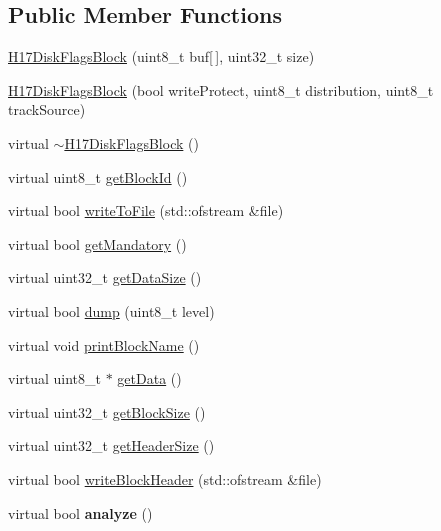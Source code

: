 \subsection*{Public Member Functions}
\begin{DoxyCompactItemize}
\item 
\hyperlink{classH17DiskFlagsBlock_a335188fe3afe1ac2dea9bd64da8bd498}{H17\+Disk\+Flags\+Block} (uint8\+\_\+t buf\mbox{[}$\,$\mbox{]}, uint32\+\_\+t size)
\item 
\hyperlink{classH17DiskFlagsBlock_ab22af88da1209fa46912ae9d59566299}{H17\+Disk\+Flags\+Block} (bool write\+Protect, uint8\+\_\+t distribution, uint8\+\_\+t track\+Source)
\item 
virtual \hyperlink{classH17DiskFlagsBlock_ac2cfc45fd4f7f697b0d55d6dff555c9c}{$\sim$\+H17\+Disk\+Flags\+Block} ()
\item 
virtual uint8\+\_\+t \hyperlink{classH17DiskFlagsBlock_a6dd7cfd338fdcdfb7b50f0b2cf1c8ed6}{get\+Block\+Id} ()
\item 
virtual bool \hyperlink{classH17DiskFlagsBlock_a50319616d0931d82ddfb58c00f5909c6}{write\+To\+File} (std\+::ofstream \&file)
\item 
virtual bool \hyperlink{classH17DiskFlagsBlock_a5b6fc1d4788fdb8cd88cbc00aa9bf32b}{get\+Mandatory} ()
\item 
virtual uint32\+\_\+t \hyperlink{classH17DiskFlagsBlock_addf34cf69e125df697a0281fe5fd6a1d}{get\+Data\+Size} ()
\item 
virtual bool \hyperlink{classH17DiskFlagsBlock_ab843a71d840fd2fc3623571ae6c9e56f}{dump} (uint8\+\_\+t level)
\item 
virtual void \hyperlink{classH17DiskFlagsBlock_abd8ef7b357afb9442537ea6cc335bd80}{print\+Block\+Name} ()
\item 
virtual uint8\+\_\+t $\ast$ \hyperlink{classH17Block_a6c2432cccdacdfb1a335bd924f19d942}{get\+Data} ()
\item 
virtual uint32\+\_\+t \hyperlink{classH17Block_a0327b6359cdf502269bbb7c6f35fae18}{get\+Block\+Size} ()
\item 
virtual uint32\+\_\+t \hyperlink{classH17Block_ad71ae203afc8713d4ee7416757fadbbe}{get\+Header\+Size} ()
\item 
virtual bool \hyperlink{classH17Block_a5c4d56a6c991c87fb9215797ce63b804}{write\+Block\+Header} (std\+::ofstream \&file)
\item 
\hypertarget{classH17Block_ae53600d945ed3ffac13d3a769a1e1ab2}{}virtual bool {\bfseries analyze} ()\label{classH17Block_ae53600d945ed3ffac13d3a769a1e1ab2}

\end{DoxyCompactItemize}
